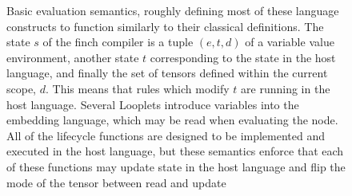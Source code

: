 \begin{figure}
    \caption{Basic evaluation semantics, roughly defining most of these language
    constructs to function similarly to their classical definitions.
    The state $s$ of the finch compiler is a tuple $(e, t, d)$ of a variable value
    environment, another state $t$ corresponding to the state in the
    host language, and finally the set of tensors defined within the current scope, $d$. 
    This means that rules which modify $t$ are running in the host language.
    Several Looplets introduce variables into the embedding
    language, which may be read when evaluating the \finchvalue node.
%
     All of the lifecycle
    functions are designed to be implemented and executed in the host language,
    but these semantics enforce that each of these functions may update state in
    the host language and flip the mode of the tensor between read and update}
    \label{fig:semantics_core}
\end{figure}


